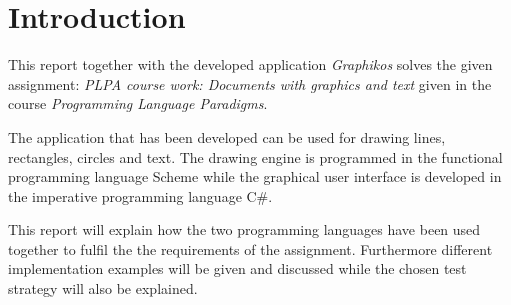 \chapter{Introduction}
\label{chp:intro}

This report together with the developed application \emph{Graphikos} solves the given assignment: \emph{PLPA course work: Documents with graphics and text} given in the course \emph{Programming Language Paradigms}.

The application that has been developed can be used for drawing lines, rectangles, circles and text. The drawing engine is programmed in the functional programming language Scheme while the graphical user interface is developed in the imperative programming language C\#. 

This report will explain how the two programming languages have been used together to fulfil the the requirements of the assignment. Furthermore different implementation examples will be given and discussed while the chosen test strategy will also be explained.

